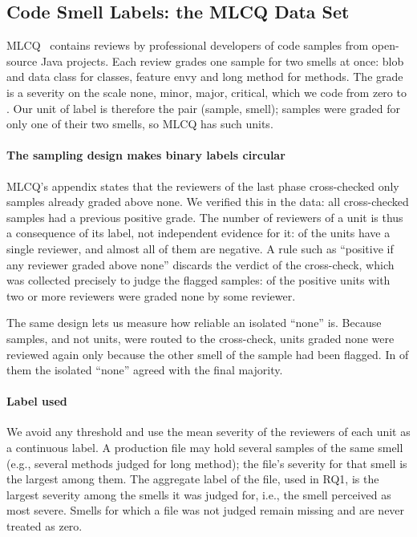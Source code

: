 \subsection{Code Smell Labels: the MLCQ Data Set}
\label{sec:mlcq}

MLCQ~\cite{madeyski2020mlcq} contains \FrevisoesMlcq{} reviews by \FrevisoresMlcq{}
professional developers of \FamostrasMlcq{} code samples from open-source Java projects.
Each review grades one sample for two smells at once: blob and data class for classes,
feature envy and long method for methods. The grade is a severity on the scale none,
minor, major, critical, which we code from zero to \FescalaMax{}. Our unit of label is
therefore the pair (sample, smell); \FamostrasUmSmell{} samples were graded for only one
of their two smells, so MLCQ has \FunidadesMlcq{} such units.

\paragraph{The sampling design makes binary labels circular}
MLCQ's appendix states that the reviewers of the last phase cross-checked only samples
already graded above none. We verified this in the data: all \FamostrasCrosscheck{}
cross-checked samples had a previous positive grade. The number of reviewers of a unit is
thus a consequence of its label, not independent evidence for it: \FpctUnidadesUmRevisor{}
of the units have a single reviewer, and almost all of them are negative. A rule such as
``positive if any reviewer graded above none'' discards the verdict of the cross-check,
which was collected precisely to judge the flagged samples: \FpctDisputadas{} of the
positive units with two or more reviewers were graded none by some reviewer.

The same design lets us measure how reliable an isolated ``none'' is. Because samples, and
not units, were routed to the cross-check, \FnoneRevisados{} units graded none were
reviewed again only because the other smell of the sample had been flagged. In
\FpctNoneSeSustenta{} of them the isolated ``none'' agreed with the final majority.

\paragraph{Label used}
We avoid any threshold and use the mean severity of the reviewers of each unit as a
continuous label. A production file may hold several samples of the same smell (e.g.,
several methods judged for long method); the file's severity for that smell is the
largest among them. The aggregate label of the file, used in RQ1, is the largest severity
among the smells it was judged for, i.e., the smell perceived as most severe. Smells for
which a file was not judged remain missing and are never treated as zero.

